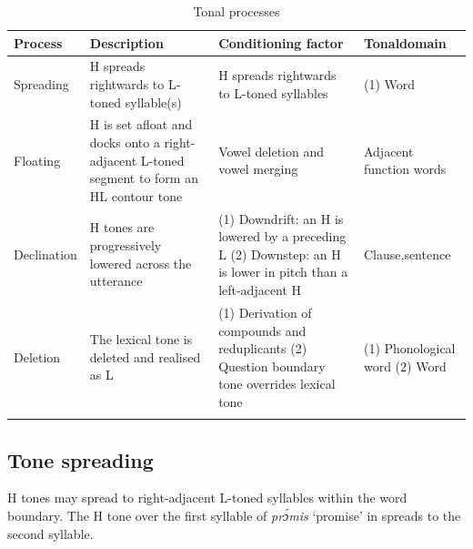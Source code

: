 \begin{table}
\caption{Tonal processes}
\label{tab:key:3.3}
\small
\begin{tabularx}{\textwidth}{lQQp{1.5cm}}
\lsptoprule
Process & Description & Conditioning factor & Tonal\newline  domain\\
\midrule 
Spreading & H spreads rightwards to L-toned syllable(s) & H spreads rightwards to L-toned syllables & (1) Word\\

\tablevspace
Floating & H is set afloat and docks onto a right-adjacent L-toned segment to form an HL contour tone & Vowel deletion and vowel merging & Adjacent function words\\

\tablevspace
Declination & H tones are progressively lowered across the utterance & (1) Downdrift: an H is lowered by a preceding L
\newline 
(2)      Downstep: an H is lower in pitch than a left-adjacent H & Clause,\newline  sentence \\

\tablevspace
Deletion & The lexical tone is deleted and realised as L & (1) Derivation of compounds and reduplicants
\newline
(2)      Question boundary tone overrides lexical tone & (1) Phonological word
\newline 
(2)         Word\\
\lspbottomrule
\end{tabularx}
\end{table}

\subsection{Tone spreading}\label{sec:3.2.1}

H tones may spread to right-adjacent L-toned syllables within the word boundary. The H tone over the first syllable of \textit{prɔ́mis} ‘promise’ in  spreads to the second syllable.

